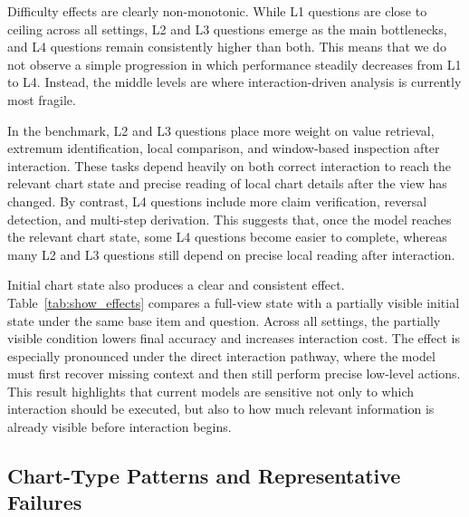 \documentclass[review,journal,hideappendix]{vgtc} %
\begin{document}
Difficulty effects are clearly non-monotonic. While L1 questions are close to ceiling across all settings, L2 and L3 questions emerge as the main bottlenecks, and L4 questions remain consistently higher than both. This means that we do not observe a simple progression in which performance steadily decreases from L1 to L4. Instead, the middle levels are where interaction-driven analysis is currently most fragile.

In the benchmark, L2 and L3 questions place more weight on value retrieval, extremum identification, local comparison, and window-based inspection after interaction. These tasks depend heavily on both correct interaction to reach the relevant chart state and precise reading of local chart details after the view has changed. By contrast, L4 questions include more claim verification, reversal detection, and multi-step derivation. This suggests that, once the model reaches the relevant chart state, some L4 questions become easier to complete, whereas many L2 and L3 questions still depend on precise local reading after interaction.

Initial chart state also produces a clear and consistent effect. Table~\ref{tab:show_effects} compares a full-view state with a partially visible initial state under the same base item and question. Across all settings, the partially visible condition lowers final accuracy and increases interaction cost. The effect is especially pronounced under the direct interaction pathway, where the model must first recover missing context and then still perform precise low-level actions. This result highlights that current models are sensitive not only to which interaction should be executed, but also to how much relevant information is already visible before interaction begins.

\subsection{Chart-Type Patterns and Representative Failures}
\end{document}
